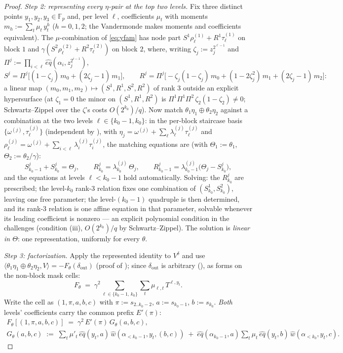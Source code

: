 \documentclass{article}
\newcommand{\Fp}{\mathbb{F}_p}
\theoremstyle{definition}
\begin{document}
\begin{proof}
\emph{Step 2: representing every $\eta$-pair at the top two levels.} Fix three distinct points $y_1, y_2, y_3 \in \Fp$ and, per level $\ell$, coefficients $\mu_t$ with moments $m_h := \sum_t \mu_t\, y_t^h$ ($h = 0, 1, 2$; the Vandermonde makes moments and coefficients equivalent). The $\mu$-combination of \cref{eq:yfam} has node part $S^1 \rho^{(1)}_\ell + R^1 \tau^{(1)}_\ell$ on block $1$ and $\gamma(S^2 \rho^{(2)}_\ell + R^2 \tau^{(2)}_\ell)$ on block $2$, where, writing $\zeta_j := z_j^{2^{\ell-1}}$ and $\Pi^j := \prod_{i<\ell} \hat{eq}(\alpha_i, z_j^{2^{i-1}})$,
\[
S^j = \Pi^j \big[(1 - \zeta_j)\, m_0 + (2\zeta_j - 1)\, m_1\big] , \qquad
R^j = \Pi^j \big[ -\zeta_j (1 - \zeta_j)\, m_0 + (1 - 2\zeta_j^2)\, m_1 + (2\zeta_j - 1)\, m_2 \big] :
\]
a linear map $(m_0, m_1, m_2) \mapsto (S^1, R^1, S^2, R^2)$ of rank $3$ outside an explicit hypersurface (at $\zeta_1 = 0$ the minor on $(S^1, R^1, R^2)$ is $\Pi^1\Pi^1\Pi^2\, \zeta_2 (1 - \zeta_2) \neq 0$; Schwartz--Zippel over the $\zeta$'s costs $O(2^{k_0})/q$). Now match $\theta_1 \eta_1 \oplus \theta_2 \eta_2$ against a combination at the two levels $\ell \in \{k_0 - 1, k_0\}$: in the per-block staircase basis $\{\omega^{(j)}, \tau^{(j)}_\ell\}$ (independent by ), with $\eta_j = \omega^{(j)} + \sum_\ell \lambda^{(j)}_\ell \tau^{(j)}_\ell$ and $\rho^{(j)}_\ell = \omega^{(j)} + \sum_{i<\ell} \lambda^{(j)}_i \tau^{(j)}_i$, the matching equations are (with $\Theta_1 := \theta_1$, $\Theta_2 := \theta_2/\gamma$):
\[
S^j_{k_0-1} + S^j_{k_0} = \Theta_j , \qquad
R^j_{k_0} = \lambda^{(j)}_{k_0}\, \Theta_j , \qquad
R^j_{k_0-1} = \lambda^{(j)}_{k_0-1}\big(\Theta_j - S^j_{k_0}\big) ,
\]
and the equations at levels $\ell < k_0 - 1$ hold automatically. Solving: the $R^j_{k_0}$ are prescribed; the level-$k_0$ rank-$3$ relation fixes one combination of $(S^1_{k_0}, S^2_{k_0})$, leaving one free parameter; the level-$(k_0-1)$ quadruple is then determined, and its rank-$3$ relation is one affine equation in that parameter, solvable whenever its leading coefficient is nonzero --- an explicit polynomial condition in the challenges (condition (iii), $O(2^{k_0})/q$ by Schwartz--Zippel). The solution is \emph{linear in $\Theta$}: one representation, uniformly for every $\theta$.

\emph{Step 3: factorization.} Apply the represented identity to $V^\delta$ and use $\langle \theta_1 \eta_1 \oplus \theta_2 \eta_2, V \rangle = -F_\theta(\delta_{\mathrm{out}})$ (proof of ); since $\delta_{\mathrm{out}}$ is arbitrary (), as forms on the non-block mask cells:
\[
F_\theta \;=\; \gamma^2 \sum_{\ell \in \{k_0-1,\, k_0\}} \sum_t \mu_{\ell, t}\, T^{\ell, y_t} .
\]
Write the cell as $(1, \pi, a, b, c)$ with $\pi := s_{2..k_0-2}$, $a := s_{k_0-1}$, $b := s_{k_0}$. \emph{Both} levels' coefficients carry the common prefix $E'(\pi)$:
\[
\begin{gathered}
F_\theta[(1, \pi, a, b, c)] \;=\; \gamma^2\, E'(\pi)\, G_\theta(a, b, c) , \\
G_\theta(a,b,c) \;:=\; \sum_t \mu'_t\, \hat{eq}(y_t, a)\, \hat{w}(\alpha_{<k_0-1}, y_t, (b, c)) \;+\; \hat{eq}(\alpha_{k_0-1}, a) \sum_t \mu_t\, \hat{eq}(y_t, b)\, \hat{w}(\alpha_{<k_0}, y_t, c) .
\end{gathered}
\]


\end{proof}
\end{document}
